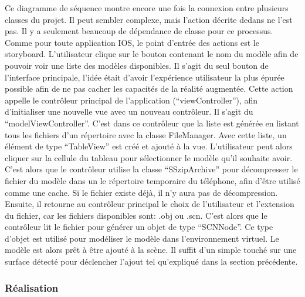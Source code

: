 \documentclass[rapport.tex]{subfiles}
\begin{document}
Ce diagramme de séquence montre encore une fois la connexion entre plusieurs classes du projet. Il peut sembler complexe, mais l’action décrite dedans ne l’est pas. Il y a seulement beaucoup de dépendance de classe pour ce processus. Comme pour toute application IOS, le point d’entrée des actions est le storyboard. L'utilisateur clique sur le bouton contenant le nom du modèle afin de pouvoir voir une liste des modèles disponibles. Il s’agit du seul bouton de l’interface principale, l’idée était d’avoir l’expérience utilisateur la plus épurée possible afin de ne pas cacher les capacités de la réalité augmentée. Cette action appelle le contrôleur principal de l’application (“viewController”), afin d’initialiser une nouvelle vue avec un nouveau contrôleur. Il s’agit du “modelViewController”. C’est dans ce contrôleur que la liste est générée en listant tous les fichiers d’un répertoire avec la classe FileManager. Avec cette liste, un élément de type “TableView” est créé et ajouté à la vue. L’utilisateur peut alors cliquer sur la cellule du tableau pour sélectionner le modèle qu’il souhaite avoir. C’est alors que le contrôleur utilise la classe “SSzipArchive” pour décompresser le fichier du modèle dans un le répertoire temporaire du téléphone, afin d’être utilisé comme une cache. Si le fichier existe déjà, il n’y aura pas de décompression. Ensuite, il retourne au contrôleur principal le choix de l’utilisateur et l’extension du fichier, car les fichiers disponibles sont: .obj ou .scn. C’est alors que le contrôleur lit le fichier pour générer un objet de type “SCNNode”. Ce type d’objet est utilisé pour modéliser le modèle dans l’environnement virtuel. Le modèle est alors prêt à être ajouté à la scène. Il suffit d’un simple touché sur une surface détecté pour déclencher l’ajout tel qu’expliqué dans la section précédente.
\subsubsection*{Réalisation}
\end{document}
